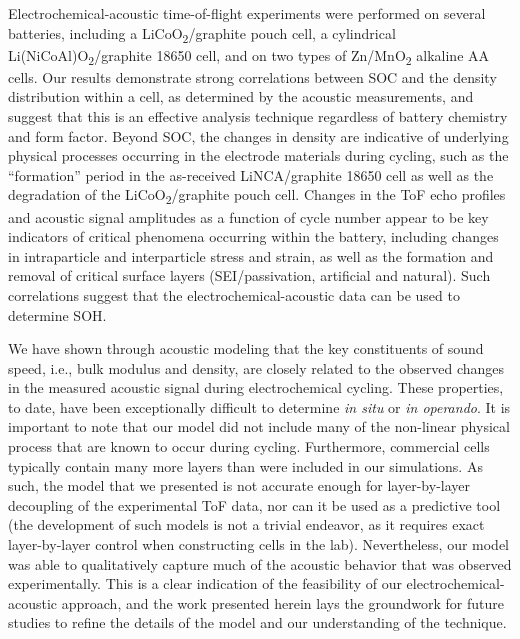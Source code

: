 \documentclass[]{article}
\begin{document}
{ }Electrochemical-acoustic time-of-flight experiments were performed on
several batteries, including a LiCoO\textsubscript{2}/graphite pouch
cell, a cylindrical Li(NiCoAl)O\textsubscript{2}/graphite 18650 cell,
and on two types of Zn/MnO\textsubscript{2} alkaline AA cells. Our
results demonstrate strong correlations between SOC and the density
distribution within a cell, as determined by the acoustic measurements,
and suggest that this is an effective analysis technique regardless of
battery chemistry and form factor. Beyond SOC, the changes in density
are indicative of underlying physical processes occurring in the
electrode materials during cycling, such as the ``formation'' period in
the as-received LiNCA/graphite 18650 cell as well as the degradation of
the LiCoO\textsubscript{2}/graphite pouch cell. Changes in the ToF echo
profiles and acoustic signal amplitudes as a function of cycle number
appear to be key indicators of critical phenomena occurring within the
battery, including changes in intraparticle and interparticle stress and
strain, as well as the formation and removal of critical surface layers
(SEI/passivation, artificial and natural). Such correlations suggest
that the electrochemical-acoustic data can be used to determine SOH.

We have shown through acoustic modeling that the key constituents of
sound speed, i.e., bulk modulus and density, are closely related to the
observed changes in the measured acoustic signal during electrochemical
cycling. These properties, to date, have been exceptionally difficult to
determine \emph{in situ} or \emph{in operando}. It is important to note
that our model did not include many of the non-linear physical process
that are known to occur during cycling. Furthermore, commercial cells
typically contain many more layers than were included in our
simulations. As such, the model that we presented is not accurate enough
for layer-by-layer decoupling of the experimental ToF data, nor can it
be used as a predictive tool (the development of such models is not a
trivial endeavor, as it requires exact layer-by-layer control when
constructing cells in the lab). Nevertheless, our model was able to
qualitatively capture much of the acoustic behavior that was observed
experimentally. This is a clear indication of the feasibility of our
electrochemical-acoustic approach, and the work presented herein lays
the groundwork for future studies to refine the details of the model and
our understanding of the technique.
\end{document}
